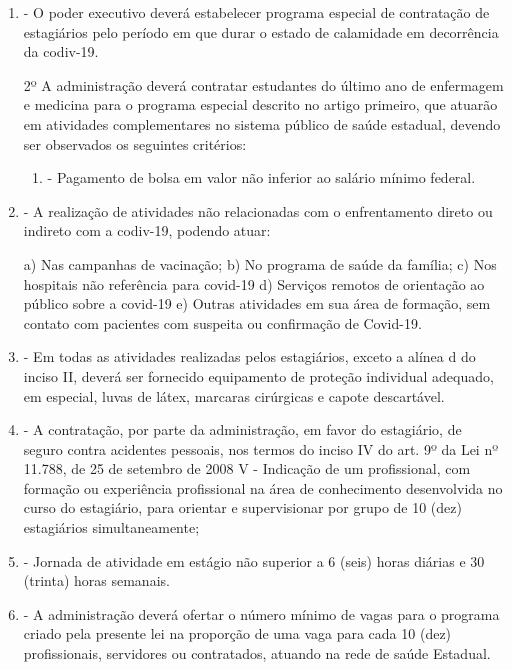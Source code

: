 \documentclass[10pt]{article}
\begin{document}
\begin{enumerate}[label=Art. \arabic*\textdegree]
\item - O poder executivo deverá estabelecer programa especial de contratação de estagiários pelo período em que durar o estado de calamidade em decorrência da codiv-19.

2º A administração deverá contratar estudantes do último ano de enfermagem e medicina para o programa especial descrito no artigo primeiro, que atuarão em atividades complementares no sistema público de saúde estadual, devendo ser observados os seguintes critérios:

\begin{enumerate}[label=\Roman*]
\item - Pagamento de bolsa em valor não inferior ao salário mínimo federal. 
\end{enumerate}
 
\item - A realização de atividades não relacionadas com o enfrentamento direto ou indireto com a codiv-19, podendo atuar:

a)	Nas campanhas de vacinação;
b)	No programa de saúde da família;
c)	Nos hospitais não referência para covid-19
d)	Serviços remotos de orientação ao público sobre a covid-19
e)	Outras atividades em sua área de formação, sem contato com pacientes com suspeita ou confirmação de Covid-19.

\item - Em todas as atividades realizadas pelos estagiários, exceto a alínea d do inciso II, deverá ser fornecido equipamento de proteção individual adequado, em especial, luvas de látex, marcaras cirúrgicas e capote descartável.

\item - A contratação, por parte da administração, em favor do estagiário, de seguro contra acidentes pessoais, nos termos do inciso IV do art. 9º da Lei nº 11.788, de  25 de setembro de 2008 V - Indicação de um profissional, com formação ou experiência profissional na área de conhecimento desenvolvida no curso do estagiário, para orientar e supervisionar por grupo de 10 (dez) estagiários simultaneamente;

\item - Jornada de atividade em estágio não superior a 6 (seis) horas diárias e 30 (trinta) horas semanais.

\item - A administração deverá ofertar o número mínimo de vagas para o programa criado pela presente lei na proporção de uma vaga para cada 10 (dez) profissionais, servidores ou contratados, atuando na rede de saúde Estadual.


\end{enumerate}
\end{document}
